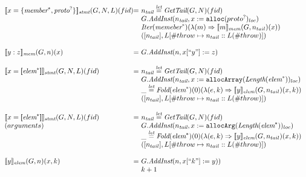 \[\begin{array}{l@{}l@{~}l}
\transfun{\irobject{x}{\emph{member}^*,\emph{proto}^{?}}}_{\emph{stmt}}(G,N,L)(fid) & = &
	n_{\emph{tail}} \letval \GetTail(G,N)(fid)\\
	& & G.\emph{AddInst}(n_{\emph{tail}},x := \TT{alloc}(proto^{?})_{loc})\\
	& & \Iter(\emph{memeber}^*)(\lambda(m)\Rightarrow \transfun{m}_{\emph{mem}}(G,n_{tail})(x))\\
	& & ([n_{tail}],L[\#throw \mapsto n_{tail}::L(\#throw)])\\
	& & \\

\transfun{\irfield{y}{z}}_{\emph{mem}}(G,n)(x) & = &
	G.\emph{AddInst}(n,x[``y"] := z)\\%
	& & \\

\transfun{\irarray{x}{\emph{elem}^*}}_{\emph{stmt}}(G,N,L)(fid) & = &
	n_{\emph{tail}} \letval \GetTail(G,N)(fid)\\
	& & G.\emph{AddInst}(n_{\emph{tail}},x :=\TT{allocArray}(\Length(\emph{elem}^*))_{loc})\\
	& & \_ \letval \Fold(\emph{elem}^*)(0)(\lambda(e,k)\Rightarrow\transfun{y}_{\emph{elem}}(G,n_{tail})(x,k))\\
	& & ([n_{tail}],L[\#throw \mapsto n_{tail}::L(\#throw)])\\
	& & \\

\transfun{\irarray{x}{\emph{elem}^*}}_{\emph{stmt}}(G,N,L)(fid) & = &
	n_{\emph{tail}} \letval \GetTail(G,N)(fid)\\
(arguments) & & G.\emph{AddInst}(n_{\emph{tail}},x :=\TT{allocArg}(\Length(\emph{elem}^*))_{loc})\\
	& & \_ \letval \Fold(\emph{elem}^*)(0)(\lambda(e,k)\Rightarrow\transfun{y}_{\emph{elem}}(G,n_{tail})(x,k))\\
	& & ([n_{tail}],L[\#throw \mapsto n_{tail}::L(\#throw)])\\
	& & \\

\transfun{y}_{\emph{elem}}(G,n)(x,k) & = &
	G.\emph{AddInst}(n,x[``k"] := y))\\%
	& & k+1\\
	& & \\
\end{array}
\]

